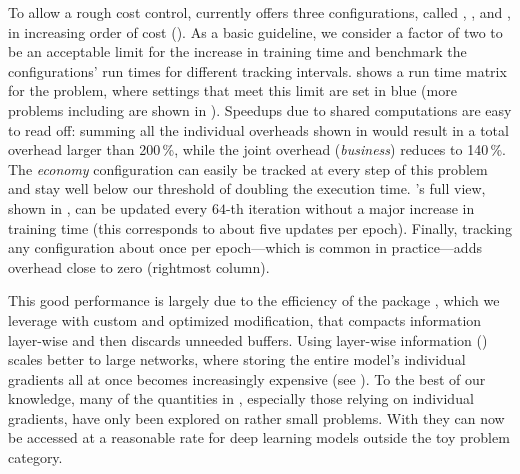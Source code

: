 To allow a rough cost control, \cockpit currently offers three configurations,
called , , and
, in increasing order of cost
(). As a basic guideline, we consider a
factor of two to be an acceptable limit for the increase in training time and
benchmark the configurations' run times for different tracking intervals.
 shows a run time matrix for the \cifarten
\threecthreed problem, where settings that meet this limit are set in blue (more
problems including \imagenet are shown in ).
Speedups due to shared computations are easy to read off: summing all the
individual overheads shown in  would
result in a total overhead larger than 200\,\%, while the joint overhead
(\textit{business}) reduces to 140\,\%. The \textit{economy} configuration can
easily be tracked at every step of this problem and stay well below our
threshold of doubling the execution time. \cockpit's full view, shown in
, can be updated every $64$-th iteration without a
major increase in training time (this corresponds to about five updates per
epoch). Finally, tracking any configuration about once per epoch---which is
common in practice---adds overhead close to zero (rightmost column).

This good performance is largely due to the efficiency of the \backpack package
\citep{dangel2020backpack}, which we leverage with custom and optimized modification,
that compacts information layer-wise and then discards unneeded buffers. Using
layer-wise information () scales better to
large networks, where storing the entire model's individual gradients all at
once becomes increasingly expensive (see ). To the best of
our knowledge, many of the quantities in ,
especially those relying on individual gradients, have only been explored on
rather small problems. With \cockpit they can now be accessed at a reasonable
rate for deep learning models outside the toy problem category.

